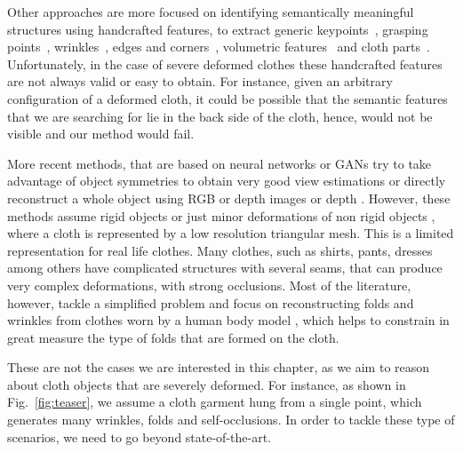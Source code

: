 Other approaches are more focused on identifying semantically meaningful structures using handcrafted features, to extract generic keypoints~\cite{Simo_ijcv2015}, grasping points~\cite{Ramisa_pr2016,doumanoglou2014active}, wrinkles~\cite{kapusta2019personalized,martinez2017recognition}, edges and corners~\cite{kampouris2016multi}, volumetric features~\cite{li2015folding} and cloth parts~\cite{Ramisa2012using}. Unfortunately, in the case of severe deformed clothes these handcrafted features are not always valid or easy to obtain. For instance, given an arbitrary configuration of a deformed cloth, it could be possible that the semantic features that we are searching for lie in the back side of the cloth, hence, would not be visible and our method would fail.

More recent methods, that are based on neural networks \cite{pumarola2020c,haeni2020corn,xie2019pix2vox} or GANs \cite{HoloGAN2019} try to take advantage of object symmetries to obtain very good view estimations or directly reconstruct a whole object using RGB or depth images \cite{zhou2020learning, yan2016perspective, varley2017shape} or depth \cite{yang-depth-w}. However, these methods assume rigid objects or just minor deformations of non rigid objects \cite{Tsoli_2019_ICCV, golyanik2018hdm}, where a cloth is represented by a low resolution triangular mesh. This is a limited representation for  real life clothes. Many clothes, such as shirts, pants, dresses among others have complicated structures with several seams, that can produce very complex deformations, with strong occlusions. Most of the literature, however, tackle a simplified problem and focus on    reconstructing folds and wrinkles from clothes worn by a human body model \cite{Gundogdu-ICCV-2019, Santesteban-EG-2019, SIZER_Dataset, Patel_2020_CVPR}, which helps to constrain in great measure the type of folds that are formed on the cloth.

These are not the cases we are interested in this chapter, as we aim to reason about cloth objects that are severely deformed. 
For instance, as shown in Fig.~\ref{fig:teaser}, we assume a cloth garment hung from a single point, which generates many wrinkles, folds and self-occlusions. In order to tackle these type of scenarios, we need to go beyond state-of-the-art.

